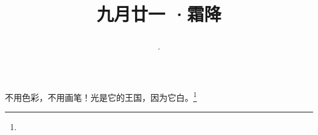 \title{\date[d=23,m=10,y=2024][year:cn-y,年,month:cn,day:cn,日,·,weekday]·九月廿一 ·霜降}
不用色彩，不用画笔！光是它的王国，因为它白。\footnote{ }

